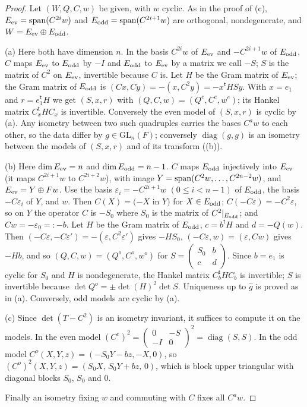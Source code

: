 \documentclass[11pt,oneside,notitlepage]{book}
\numberwithin{equation}{section}
\theoremstyle{plain}
\theoremstyle{definition}
\newcommand{\GL}{\mathrm{GL}}
\newcommand{\diag}{\operatorname{diag}}
\begin{document}
\begin{proof}
	Let $(W,Q,C,w)$ be given, with $w$ cyclic. As in the proof of (c), $E_{\rm ev}={\rm span}(C^{2i}w)$ and $E_{\rm odd}={\rm span}(C^{2i+1}w)$ are orthogonal, nondegenerate, and $W=E_{\rm ev}\oplus E_{\rm odd}$.
	
	(a) Here both have dimension $n$. In the basis $C^{2i}w$ of $E_{\rm ev}$ and $-C^{2i+1}w$ of $E_{\rm odd}$, $C$ maps $E_{\rm ev}$ to $E_{\rm odd}$ by $-I$ and $E_{\rm odd}$ to $E_{\rm ev}$ by a matrix we call $-S$; $S$ is the matrix of $C^2$ on $E_{\rm ev}$, invertible because $C$ is. Let $H$ be the Gram matrix of $E_{\rm ev}$; the Gram matrix of $E_{\rm odd}$ is $(Cx,Cy)=-(x,C^2y)=-x^{\mathsf t}HSy$. With $x=e_1$ and $r=e_1^{\mathsf t}H$ we get $(S,x,r)$ with $(Q,C,w)=(Q^e,C^e,w^e)$; its Hankel matrix $C_x^{\mathsf t}HC_x$ is invertible. Conversely the even model of $(S,x,r)$ is cyclic by (a). Any isometry between two such quadruples carries the bases $C^aw$ to each other, so the data differ by $g\in\GL_n(F)$; conversely $\diag(g,g)$ is an isometry between the models of $(S,x,r)$ and of its transform ((b)).
	
	(b) Here $\dim E_{\rm ev}=n$ and $\dim E_{\rm odd}=n-1$. $C$ maps $E_{\rm odd}$ injectively into $E_{\rm ev}$ (it maps $C^{2i+1}w$ to $C^{2i+2}w$), with image $Y={\rm span}(C^2w,\dots,C^{2n-2}w)$, and $E_{\rm ev}=Y\oplus Fw$. Use the basis $\varepsilon_i=-C^{2i+1}w$ $(0\le i<n-1)$ of $E_{\rm odd}$, the basis $-C\varepsilon_i$ of $Y$, and $w$. Then $C(X)=(-X$ in $Y)$ for $X\in E_{\rm odd}$; $C(-C\varepsilon)=-C^2\varepsilon$, so on $Y$ the operator $C$ is $-S_0$ where $S_0$ is the matrix of $C^2|_{E_{\rm odd}}$; and $Cw=-\varepsilon_0=:-b$. Let $H$ be the Gram matrix of $E_{\rm odd}$, $c=b^{\mathsf t}H$ and $d=-Q(w)$. Then $(-C\varepsilon,-C\varepsilon')=-(\varepsilon,C^2\varepsilon')$ gives $-HS_0$, $(-C\varepsilon,w)=(\varepsilon,Cw)$ gives $-Hb$, and so $(Q,C,w)=(Q^o,C^o,w^o)$ for $S=\left(\begin{smallmatrix}S_0&b\\c&d\end{smallmatrix}\right)$. Since $b=e_1$ is cyclic for $S_0$ and $H$ is nondegenerate, the Hankel matrix $C_b^{\mathsf t}HC_b$ is invertible; $S$ is invertible because $\det Q^o=\pm\det(H)^2\det S$. Uniqueness up to $\hat g$ is proved as in (a). Conversely, odd models are cyclic by (a).
	
	(c) Since $\det(T-C^2)$ is an isometry invariant, it suffices to compute it on the models. In the even model $(C^e)^2=\left(\begin{smallmatrix}0&-S\\-I&0\end{smallmatrix}\right)^2=\diag(S,S)$. In the odd model $C^o(X,Y,z)=(-S_0Y-bz,-X,0)$, so $(C^o)^2(X,Y,z)=(S_0X,\,S_0Y+bz,\,0)$, which is block upper triangular with diagonal blocks $S_0$, $S_0$ and $0$.
	
	Finally an isometry fixing $w$ and commuting with $C$ fixes all $C^aw$.
\end{proof}
\end{document}
